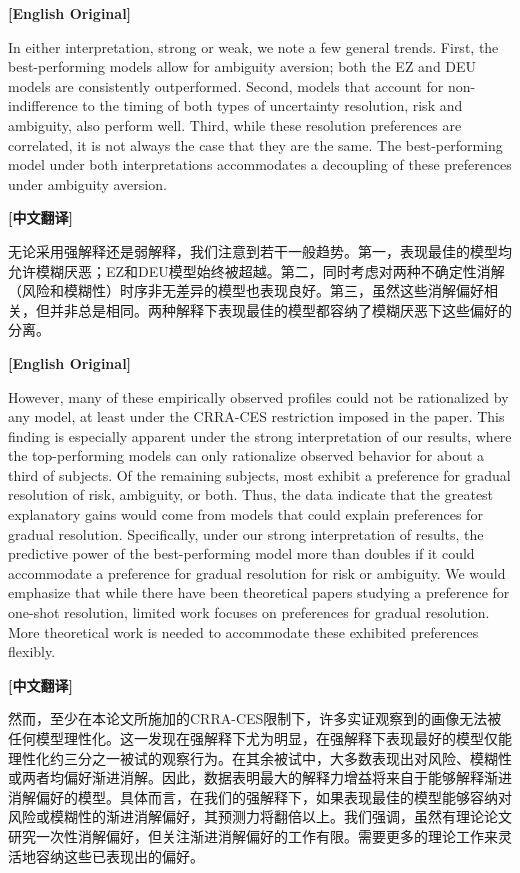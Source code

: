 \documentclass[12pt,a4paper]{ctexart}
\newenvironment{original}{%
  \par\medskip\noindent\textbf{[English Original]}\par\smallskip
  \color{black}\small
}{%
  \par\medskip
}
\newenvironment{translation}{%
  \par\noindent\textbf{[中文翻译]}\par\smallskip
  \color{blue}\small
}{%
  \par\bigskip
}
\theoremstyle{definition}
\theoremstyle{remark}
\begin{document}
\begin{original}
In either interpretation, strong or weak, we note a few general trends. First, the best-performing models allow for ambiguity aversion; both the EZ and DEU models are consistently outperformed. Second, models that account for non-indifference to the timing of both types of uncertainty resolution, risk and ambiguity, also perform well. Third, while these resolution preferences are correlated, it is not always the case that they are the same. The best-performing model under both interpretations accommodates a decoupling of these preferences under ambiguity aversion.
\end{original}
\begin{translation}
无论采用强解释还是弱解释，我们注意到若干一般趋势。第一，表现最佳的模型均允许模糊厌恶；EZ和DEU模型始终被超越。第二，同时考虑对两种不确定性消解（风险和模糊性）时序非无差异的模型也表现良好。第三，虽然这些消解偏好相关，但并非总是相同。两种解释下表现最佳的模型都容纳了模糊厌恶下这些偏好的分离。
\end{translation}

\begin{original}
However, many of these empirically observed profiles could not be rationalized by any model, at least under the CRRA-CES restriction imposed in the paper. This finding is especially apparent under the strong interpretation of our results, where the top-performing models can only rationalize observed behavior for about a third of subjects. Of the remaining subjects, most exhibit a preference for gradual resolution of risk, ambiguity, or both. Thus, the data indicate that the greatest explanatory gains would come from models that could explain preferences for gradual resolution. Specifically, under our strong interpretation of results, the predictive power of the best-performing model more than doubles if it could accommodate a preference for gradual resolution for risk or ambiguity. We would emphasize that while there have been theoretical papers studying a preference for one-shot resolution, limited work focuses on preferences for gradual resolution. More theoretical work is needed to accommodate these exhibited preferences flexibly.
\end{original}
\begin{translation}
然而，至少在本论文所施加的CRRA-CES限制下，许多实证观察到的画像无法被任何模型理性化。这一发现在强解释下尤为明显，在强解释下表现最好的模型仅能理性化约三分之一被试的观察行为。在其余被试中，大多数表现出对风险、模糊性或两者均偏好渐进消解。因此，数据表明最大的解释力增益将来自于能够解释渐进消解偏好的模型。具体而言，在我们的强解释下，如果表现最佳的模型能够容纳对风险或模糊性的渐进消解偏好，其预测力将翻倍以上。我们强调，虽然有理论论文研究一次性消解偏好，但关注渐进消解偏好的工作有限。需要更多的理论工作来灵活地容纳这些已表现出的偏好。
\end{translation}
\end{document}

